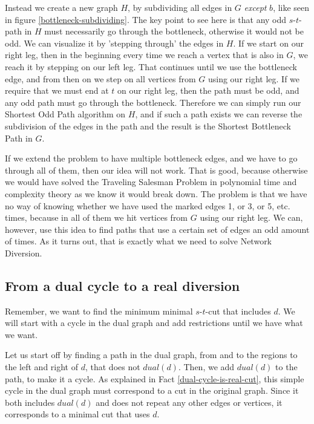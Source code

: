 Instead we create a new graph $H$, by subdividing all edges in $G$ \emph{except} $b$, like seen in figure \ref{bottleneck-subdividing}. The key point to see here is that any odd $s$-$t$-path in $H$ must necessarily go through the bottleneck, otherwise it would not be odd. We can visualize it by 'stepping through' the edges in $H$. If we start on our right leg, then in the beginning every time we reach a vertex that is also in $G$, we reach it by stepping on our left leg. That continues until we use the bottleneck edge, and from then on we step on all vertices from $G$ using our right leg. If we require that we must end at $t$ on our right leg, then the path must be odd, and any odd path must go through the bottleneck. Therefore we can simply run our Shortest Odd Path algorithm on $H$, and if such a path exists we can reverse the subdivision of the edges in the path and the result is the Shortest Bottleneck Path in $G$.

If we extend the problem to have multiple bottleneck edges, and we have to go through all of them, then our idea will not work. That is good, because otherwise we would have solved the Traveling Salesman Problem in polynomial time and complexity theory as we know it would break down.
The problem is that we have no way of knowing whether we have used the marked edges 1, or 3, or 5, etc. times, because in all of them we hit vertices from $G$ using our right leg. We can, however, use this idea to find paths that use a certain set of edges an odd amount of times. As it turns out, that is exactly what we need to solve Network Diversion.


\subsection{From a dual cycle to a real diversion}
Remember, we want to find the minimum minimal $s$-$t$-cut that includes $d$.  We will start with a cycle in the dual graph and add restrictions until we have what we want.

Let us start off by finding a path in the dual graph, from and to the regions to the left and right of $d$, that does not $dual(d)$. Then, we add $dual(d)$ to the path, to make it a cycle. As explained in Fact \ref{dual-cycle-is-real-cut}, this simple cycle in the dual graph must correspond to a cut in the original graph. Since it both includes $dual(d)$ and does not repeat any other edges or vertices, it corresponds to a minimal cut that uses $d$.

